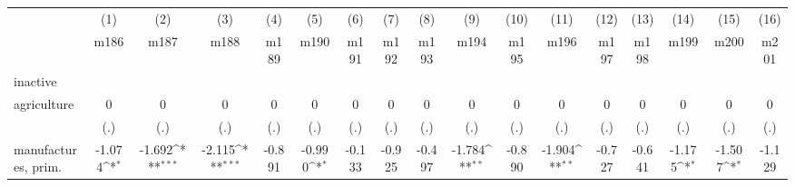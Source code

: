 {
\def\sym#1{\ifmmode^{#1}\else\(^{#1}\)\fi}
\begin{tabular}{l*{16}{c}}
\hline\hline
                    &\multicolumn{1}{c}{(1)}&\multicolumn{1}{c}{(2)}&\multicolumn{1}{c}{(3)}&\multicolumn{1}{c}{(4)}&\multicolumn{1}{c}{(5)}&\multicolumn{1}{c}{(6)}&\multicolumn{1}{c}{(7)}&\multicolumn{1}{c}{(8)}&\multicolumn{1}{c}{(9)}&\multicolumn{1}{c}{(10)}&\multicolumn{1}{c}{(11)}&\multicolumn{1}{c}{(12)}&\multicolumn{1}{c}{(13)}&\multicolumn{1}{c}{(14)}&\multicolumn{1}{c}{(15)}&\multicolumn{1}{c}{(16)}\\
                    &\multicolumn{1}{c}{m186}&\multicolumn{1}{c}{m187}&\multicolumn{1}{c}{m188}&\multicolumn{1}{c}{m189}&\multicolumn{1}{c}{m190}&\multicolumn{1}{c}{m191}&\multicolumn{1}{c}{m192}&\multicolumn{1}{c}{m193}&\multicolumn{1}{c}{m194}&\multicolumn{1}{c}{m195}&\multicolumn{1}{c}{m196}&\multicolumn{1}{c}{m197}&\multicolumn{1}{c}{m198}&\multicolumn{1}{c}{m199}&\multicolumn{1}{c}{m200}&\multicolumn{1}{c}{m201}\\
\hline
inactive            &                     &                     &                     &                     &                     &                     &                     &                     &                     &                     &                     &                     &                     &                     &                     &                     \\
agriculture         &           0         &           0         &           0         &           0         &           0         &           0         &           0         &           0         &           0         &           0         &           0         &           0         &           0         &           0         &           0         &           0         \\
                    &         (.)         &         (.)         &         (.)         &         (.)         &         (.)         &         (.)         &         (.)         &         (.)         &         (.)         &         (.)         &         (.)         &         (.)         &         (.)         &         (.)         &         (.)         &         (.)         \\
[1em]
manufactures, prim. &      -1.074\sym{*}  &      -1.692\sym{***}&      -2.115\sym{***}&      -0.891         &      -0.990\sym{*}  &      -0.133         &      -0.925         &      -0.497         &      -1.784\sym{**} &      -0.890         &      -1.904\sym{**} &      -0.727         &      -0.641         &      -1.175\sym{*}  &      -1.507\sym{*}  &      -1.129         \\

\end{tabular}}
